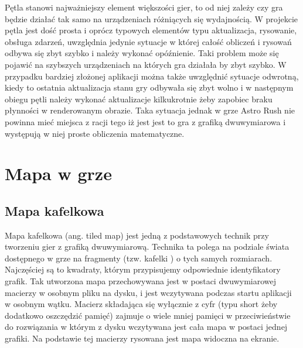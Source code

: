 Pętla stanowi najważniejszy element większości gier, to od niej zależy czy gra będzie działać tak samo na urządzeniach różniących się wydajnością. W projekcie pętla jest dość prosta i oprócz typowych elementów typu aktualizacja, rysowanie, obsługa zdarzeń, uwzględnia jedynie sytuacje w której całość obliczeń i rysowań odbywa się zbyt szybko i należy wykonać opóźnienie. Taki problem może się pojawić na szybszych urządzeniach na których gra działała by zbyt szybko. W przypadku bardziej złożonej aplikacji można także uwzględnić sytuacje odwrotną, kiedy to ostatnia aktualizacja stanu gry odbywała się zbyt wolno i w następnym obiegu pętli należy wykonać aktualizacje kilkukrotnie żeby zapobiec braku płynności w renderowanym obrazie. Taka sytuacja jednak w grze Astro Rush nie powinna mieć miejsca z racji tego iż jest jest to gra z grafiką dwuwymiarowa i występują w niej proste obliczenia matematyczne.


\section{Mapa w grze}

\subsection{Mapa kafelkowa}
Mapa kafelkowa (ang. tiled map) jest jedną z podstawowych technik przy tworzeniu gier z grafiką dwuwymiarową. Technika ta polega na podziale świata dostępnego w grze na fragmenty (tzw. kafelki ) o tych samych rozmiarach. Najczęściej są to kwadraty, którym przypisujemy odpowiednie identyfikatory grafik. Tak utworzona mapa przechowywana jest w postaci dwuwymiarowej macierzy w osobnym pliku na dysku, i jest wczytywana podczas startu aplikacji w osobnym wątku. Macierz składająca się wyłącznie z cyfr (typu short żeby dodatkowo oszczędzić pamięć) zajmuje o wiele mniej pamięci w przeciwieństwie do rozwiązania w którym  z dysku wczytywana jest cała mapa w postaci jednej grafiki. Na podstawie tej macierzy rysowana jest mapa widoczna na ekranie. 

